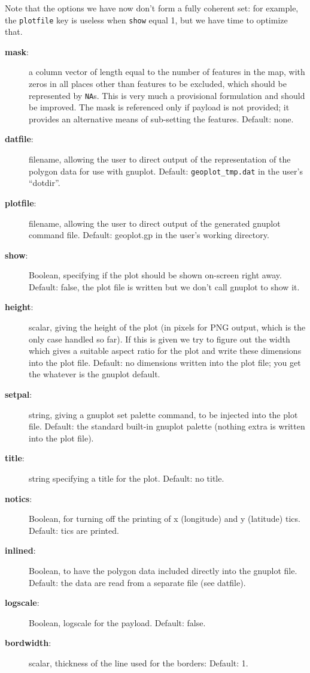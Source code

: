 \documentclass[a4paper]{article}
\begin{document}
Note that the options we have now don't form a fully coherent set: for
example, the \texttt{plotfile} key is useless when \texttt{show} equal
1, but we have time to optimize that.
\begin{description}
\item[\textbf{mask}:] a column vector of length equal to the number of
  features in the map, with zeros in all places other than features to
  be excluded, which should be represented by \texttt{NA}s. This is
  very much a provisional formulation and should be improved. The mask
  is referenced only if payload is not provided; it provides an
  alternative means of sub-setting the features. Default: none.
\item[\textbf{datfile}:] filename, allowing the user to direct
  output of the representation of the polygon data for use with
  gnuplot. Default: \texttt{geoplot\_tmp.dat} in the user’s “dotdir”.
\item[\textbf{plotfile}:] filename, allowing the user to direct output
  of the generated gnuplot command file. Default: geoplot.gp in the
  user’s working directory.
\item[\textbf{show}:] Boolean, specifying if the plot should be shown
  on-screen right away. Default: false, the plot file is written but
  we don’t call gnuplot to show it.
\item[\textbf{height}:] scalar, giving the height of the plot (in
  pixels for PNG output, which is the only case handled so far). If
  this is given we try to figure out the width which gives a suitable
  aspect ratio for the plot and write these dimensions into the plot
  file. Default: no dimensions written into the plot file; you get the
  whatever is the gnuplot default.
\item[\textbf{setpal}:] string, giving a gnuplot set palette command,
  to be injected into the plot file.  Default: the standard built-in
  gnuplot palette (nothing extra is written into the plot file).
\item[\textbf{title}:] string specifying a title for the
  plot. Default: no title.
\item[\textbf{notics}:] Boolean, for turning off the printing of x
  (longitude) and y (latitude) tics. Default: tics are printed.
\item[\textbf{inlined}:] Boolean, to have the polygon data included
  directly into the gnuplot file. Default: the data are read from a
  separate file (see datfile).
\item[\textbf{logscale}:] Boolean, logscale for the payload. Default: false.
\item[\textbf{bordwidth}:] scalar, thickness of the line used for the
  borders: Default: 1.
\end{description}
\end{document}
